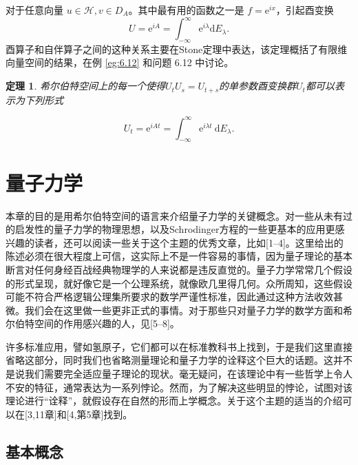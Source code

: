 \documentclass[hyperref,UTF8]{ctexbook}
\newtheorem{theorem}{定理}[chapter]
\begin{document}
对于任意向量 \(u \in \mathcal{H}, v \in D_{A}\)。其中最有用的函数之一是 \(f=\mathrm{e}^{i x}\)，引起酉变换
\[
U=\mathrm{e}^{i A}=\int_{-\infty}^{\infty} \mathrm{e}^{i \lambda} \mathrm{d} E_{\lambda} .
\]
酉算子和自伴算子之间的这种关系主要在Stone定理中表达，该定理概括了有限维向量空间的结果，在例 \ref{eg:6.12} 和问题 6.12 中讨论。
\begin{theorem}
    希尔伯特空间上的每一个使得\(U_{t} U_{s}=U_{t+s}\)的单参数酉变换群\(U_{t}\)都可以表示为下列形式
\end{theorem}
\[
U_{t}=\mathrm{e}^{i A t}=\int_{-\infty}^{\infty} \mathrm{e}^{i \lambda t} \mathrm{~d} E_{\lambda} .
\]
\chapter{量子力学}
本章的目的是用希尔伯特空间的语言来介绍量子力学的关键概念。对一些从未有过的启发性的量子力学的物理思想，以及Schrodinger方程的一些更基本的应用更感兴趣的读者，还可以阅读一些关于这个主题的优秀文章，比如[1–4]。这里给出的陈述必须在很大程度上可信，这实际上不是一件容易的事情，因为量子理论的基本断言对任何身经百战经典物理学的人来说都是违反直觉的。量子力学常常几个假设的形式呈现，就好像它是一个公理系统，就像欧几里得几何。众所周知，这些假设可能不符合严格逻辑公理集所要求的数学严谨性标准，因此通过这种方法收效甚微。我们会在这里做一些更非正式的事情。对于那些只对量子力学的数学方面和希尔伯特空间的作用感兴趣的人，见[5–8]。

许多标准应用，譬如氢原子，它们都可以在标准教科书上找到，于是我们这里直接省略这部分，同时我们也省略测量理论和量子力学的诠释这个巨大的话题。这并不是说我们需要完全适应量子理论的现状。毫无疑问，在该理论中有一些哲学上令人不安的特征，通常表达为一系列悖论。然而，为了解决这些明显的悖论，试图对该理论进行“诠释”，就假设存在自然的形而上学概念。关于这个主题的适当的介绍可以在[3,11章]和[4,第5章]找到。
\section{基本概念}
\end{document}
